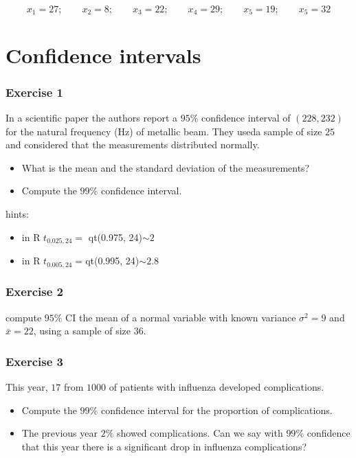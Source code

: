 \documentclass[
]{book}
\begin{document}
\[x_1 = 27; \qquad x_2 = 8; \qquad  x_3 = 22; \qquad  x_4 = 29; \qquad  x_5 = 19; \qquad  x_5 = 32\]

\hypertarget{confidence-intervals}{%
\section{Confidence intervals}\label{confidence-intervals}}

\hypertarget{exercise-1-9}{%
\subsubsection{Exercise 1}\label{exercise-1-9}}

In a scientific paper the authors report a \(95\%\) confidence interval of \((228, 232)\) for the natural frequency (Hz) of metallic beam. They useda sample of size \(25\) and considered that the measurements distributed normally.

\begin{itemize}
\item
  What is the mean and the standard deviation of the measurements?
\item
  Compute the \(99\%\) confidence interval.
\end{itemize}

hints:

\begin{itemize}
\item
  in R \(t_{0.025, 24}=\) qt(0.975, 24)\(\sim 2\)
\item
  in R \(t_{0.005, 24}=\)qt(0.995, 24)\(\sim 2.8\)
\end{itemize}

\hypertarget{exercise-2-9}{%
\subsubsection{Exercise 2}\label{exercise-2-9}}

compute \(95\%\) CI the mean of a normal variable with known variance \(\sigma^2=9\) and \(\bar{x}=22\), using a sample of size \(36\).

\hypertarget{exercise-3-6}{%
\subsubsection{Exercise 3}\label{exercise-3-6}}

This year, \(17\) from \(1000\) of patients with influenza developed complications.

\begin{itemize}
\item
  Compute the \(99\%\) confidence interval for the proportion of complications.
\item
  The previous year \(2\%\) showed complications. Can we say with \(99\%\) confidence that this year there is a significant drop in influenza complications?
\end{itemize}
\end{document}
